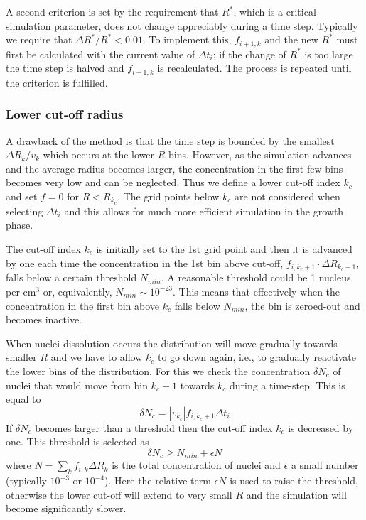\documentclass[12pt,a4paper]{article}
\begin{document}
A second criterion is set by the requirement that $R^*$, which is a critical simulation parameter, does not change appreciably during a time step. Typically we require that $\Delta R^* / R^* < 0.01$. To implement this, $f_{i+1,k}$ and the new $R^*$ must first be calculated with the current value of $\Delta t_i$; if the change of $R^*$ is too large the time step is halved and $f_{i+1,k}$ is recalculated. The process is repeated until the criterion is fulfilled. 

\subsubsection{Lower cut-off radius} 

A drawback of the method is that the time step is bounded by the smallest $\Delta R_k / v_k$ which occurs at the lower $R$ bins. However, as the simulation advances and the average radius becomes larger, the concentration in the first few bins becomes very low and can be neglected. Thus we define a lower cut-off index $k_c$ and set $f=0$ for $R<R_{k_c}$. The grid points below $k_c$ are not considered when selecting  $\Delta t_i$ and this allows for much more efficient simulation in the growth phase. 

The cut-off index $k_c$ is initially set to the 1st grid point and then it is advanced by one each time the concentration in the 1st bin above cut-off, $f_{i,k_c+1}\cdot \Delta R_{k_c+1}$, falls below a certain threshold $N_{min}$. A reasonable threshold could be 1 nucleus per cm$^3$ or, equivalently, $N_{min}\sim 10^{-23}$. This means that effectively when the concentration in the first bin above $k_c$ falls below $N_{min}$, the bin is zeroed-out and becomes inactive. 

When nuclei dissolution occurs the distribution will move gradually towards smaller $R$ and we have to allow $k_c$ to go down again, i.e., to gradually reactivate the lower bins of the distribution. For this we check the concentration $\delta N_c$ of nuclei that would move from bin $k_c+1$ towards $k_c$ during a time-step. This is equal to 
\[
\delta N_c = |v_{k_c}| f_{i,k_c+1} \Delta t_i
\] 
If $\delta N_c$ becomes larger than a threshold then the cut-off index $k_c$ is decreased by one. This threshold is selected as
\begin{equation}
\delta N_c \geq N_{min} + \epsilon N
\end{equation}
where $N = \sum_k {f_{i,k} \Delta R_k}$ is the total concentration of nuclei and $\epsilon$ a small number (typically $10^{-3}$ or $10^{-4}$). Here the relative term $\epsilon N$ is used to raise the threshold, otherwise the lower cut-off will extend to very small $R$ and the simulation will become significantly slower. 



\end{document}
